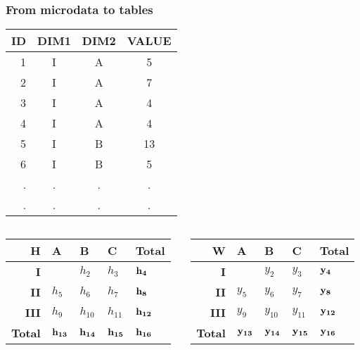 \begin{frame}\frametitle{From microdata to tables}
	\vspace{-0.2cm}
	\begin{center}
	\begin{tabular}{|r|ccc|}
	\hline
	{\bf ID} & {\bf DIM1} & {\bf DIM2} & {\bf VALUE}  \\ \hline
	1 & I & A & 5 \\ 
	2 & I & A & 7 \\ 
	3 & I & A & 4 \\	
	4 & I & A & 4 \\
	5 & I & B & 13 \\ 
	6 & I & B & 5 \\ 	
	. & . & . & . \\ 	
	. & . & . & . \\ 			
	\hline
	\end{tabular}
	\end{center}
	
	\vspace{-1cm}
	
	\begin{columns}
	\begin{column}{5cm}
		\begin{center}
			\begin{tabular}{|r|lll|l|}
			\hline
			{\bf H} & {\bf A} & {\bf B} & {\bf C} & {\bf Total} \\ 
			\hline
			{\bf I} & \cbw{$h_1$} & $h_2$ & $h_3$ & $\mathbf{h_4}$ \\ 
			{\bf II} & $h_5$ & $h_6$ & $h_7$ & $\mathbf{h_8}$ \\ 
			{\bf III} & $h_9$ & $h_{10}$ & $h_{11}$ & $\mathbf{h_{12}}$ \\ 
			\hline
			{\bf Total} & $\mathbf{h_{13}}$ & $\mathbf{h_{14}}$ & $\mathbf{h_{15}}$ & $\mathbf{h_{16}}$ \\
			\hline
			\end{tabular}
		\end{center}		
	\end{column}
	\begin{column}{5cm}
		\begin{center}
			\begin{tabular}{|r|lll|l|}
			\hline
			{\bf W} & {\bf A} & {\bf B} & {\bf C} & {\bf Total} \\ 
			\hline
			{\bf I} & \cbw{$y_1$} & $y_2$ & $y_3$ & $\mathbf{y_4}$ \\ 
			{\bf II} & $y_5$ & $y_6$ & $y_7$ & $\mathbf{y_8}$ \\ 
			{\bf III} & $y_9$ & $y_{10}$ & $y_{11}$ & $\mathbf{y_{12}}$ \\ 
			\hline
			{\bf Total} & $\mathbf{y_{13}}$ & $\mathbf{y_{14}}$ & $\mathbf{y_{15}}$ & $\mathbf{y_{16}}$ \\
			\hline
			\end{tabular}
		\end{center}			
		\end{column}
	\end{columns}
\end{frame}


